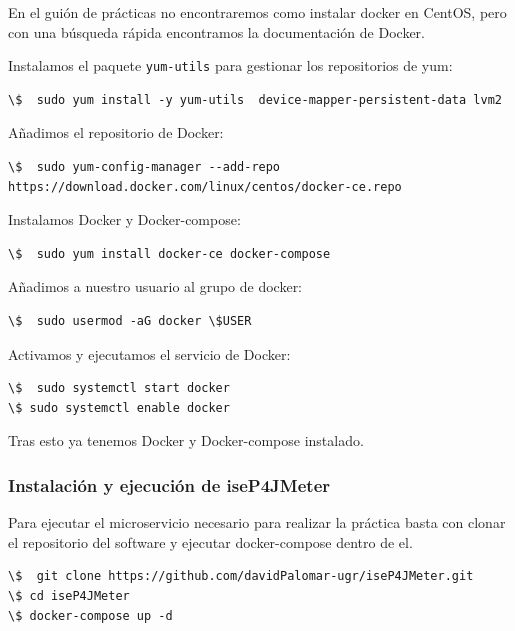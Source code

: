 \documentclass[12pt, spanish]{article}
\begin{document}
En el guión de prácticas no encontraremos como instalar docker en CentOS, pero con una búsqueda rápida encontramos la documentación de Docker\cite{dockerCentOS}.

Instalamos el paquete \texttt{yum-utils} para gestionar los repositorios de yum:

\begin{verbatim}
\$  sudo yum install -y yum-utils  device-mapper-persistent-data lvm2
\end{verbatim}


Añadimos el repositorio de Docker:

\begin{verbatim}
\$  sudo yum-config-manager --add-repo https://download.docker.com/linux/centos/docker-ce.repo
\end{verbatim}


Instalamos Docker y Docker-compose:

\begin{verbatim}
\$  sudo yum install docker-ce docker-compose
\end{verbatim}


Añadimos a nuestro usuario al grupo de docker:
\begin{verbatim}
\$  sudo usermod -aG docker \$USER
\end{verbatim}

Activamos y ejecutamos el servicio de Docker:
\begin{verbatim}
\$  sudo systemctl start docker
\$ sudo systemctl enable docker
\end{verbatim}


Tras esto ya tenemos Docker y Docker-compose instalado.


\subsubsection{Instalación y ejecución de iseP4JMeter}

Para ejecutar el microservicio necesario para realizar la práctica basta con clonar el repositorio del software\cite{iseP4JMeter} y ejecutar docker-compose dentro de el.

\begin{verbatim}
\$  git clone https://github.com/davidPalomar-ugr/iseP4JMeter.git
\$ cd iseP4JMeter
\$ docker-compose up -d
\end{verbatim}
\end{document}
